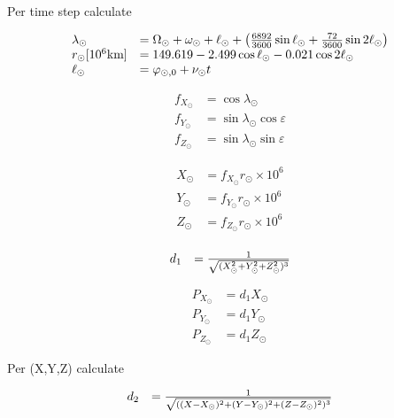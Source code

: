 \documentclass{article}
\begin{document}
Per time step calculate

\begin{equation}
\begin{array}{ll}
\lambda_\odot &= \Omega_\odot+\omega_\odot+\ell_{\odot}+\left(
{6892\over3600} \sin \ell_{\odot} + {72\over 3600} \sin 2\ell_{\odot}\right)\\
r_\odot[10^6\mbox{km}] &=149.619-2.499 \cos \ell_{\odot} - 0.021 \cos 2\ell_{\odot}\\
\ell_{\odot} &= \varphi_{\odot,0}+\nu_\odot t
\end{array}
\end{equation}

\begin{equation}
\begin{array}{ll}
f_{X_{\odot}} &=\cos \lambda_\odot \\
f_{Y_{\odot}} &=\sin \lambda_\odot \cos \varepsilon \\
f_{Z_{\odot}} &=\sin \lambda_\odot \sin \varepsilon
\end{array}
\end{equation}

\begin{equation}
\begin{array}{ll}
X_{\odot} &= f_{X_{\odot}}r_\odot\times 10^{6} \\
Y_{\odot} &= f_{Y_{\odot}}r_\odot\times 10^{6} \\
Z_{\odot} &= f_{Z_{\odot}}r_\odot\times 10^{6} \\
\end{array}
\end{equation}

\begin{equation}
\begin{array}{ll}
d_1 &= {1 \over \sqrt{(X_\odot^2+Y_\odot^2+Z_\odot^2)^3}}
\end{array}
\end{equation}

\begin{equation}
\begin{array}{ll}
P_{X_{\odot}} &= d_1X_{\odot} \\
P_{Y_{\odot}} &= d_1Y_{\odot} \\
P_{Z_{\odot}} &= d_1Z_{\odot}
\end{array}
\end{equation}

Per (X,Y,Z) calculate

\begin{equation}
\begin{array}{ll}
d_2 &= {1 \over \sqrt{((X-X_\odot)^2+(Y-Y_\odot)^2+(Z-Z_\odot)^2)^3}}
\end{array}
\end{equation}
\end{document}
